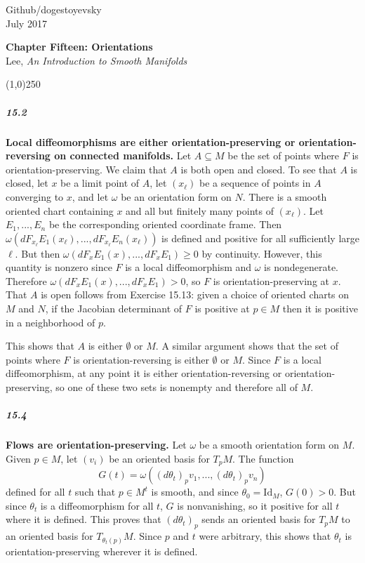 \documentclass[10pt,letter]{article}
\begin{document}
\noindent Github/dogestoyevsky \\
July 2017
\begin{center}
\textbf{Chapter Fifteen: Orientations}\\ Lee, \textit{An Introduction to Smooth Manifolds}

\line(1,0){250}
\end{center}
\subparagraph*{15.2} {\bf Local diffeomorphisms are either orientation-preserving or orientation-reversing on connected manifolds.} Let $A \subseteq M$ be the set of points where $F$ is orientation-preserving. We claim that $A$ is both open and closed. To see that $A$ is closed, let $x$ be a limit point of $A$, let $(x_\ell)$ be a sequence of points in $A$ converging to $x$, and let $\omega$ be an orientation form on $N$. There is a smooth oriented chart containing $x$ and all but finitely many points of $(x_\ell)$. Let $E_1,...,E_n$ be the corresponding oriented coordinate frame. Then $\omega(dF_{x_\ell}E_1(x_\ell),...,dF_{x_\ell}E_n(x_\ell))$ is defined and positive for all sufficiently large $\ell$. But then $\omega(dF_{x}E_1(x),...,dF_{x}E_1) \geq 0$ by continuity. However, this quantity is nonzero since $F$ is a local diffeomorphism and $\omega$ is nondegenerate. Therefore $\omega(dF_{x}E_1(x),...,dF_{x}E_1) > 0$, so $F$ is orientation-preserving at $x$. That $A$ is open follows from Exercise 15.13: given a choice of oriented charts on $M$ and $N$, if the Jacobian determinant of $F$ is positive at $p \in M$ then it is positive in a neighborhood of $p$. 

This shows that $A$ is either $\emptyset$ or $M$. A similar argument shows that the set of points where $F$ is orientation-reversing is either $\emptyset$ or $M$. Since $F$ is a local diffeomorphism, at any point it is either orientation-reversing or orientation-preserving, so one of these two sets is nonempty and therefore all of $M$. 

\subparagraph*{15.4} {\bf Flows are orientation-preserving.} Let $\omega$ be a smooth orientation form on $M$. Given $p \in M$, let $(v_i)$ be an oriented basis for $T_pM$. The function \[ G(t) =  \omega((d\theta_t)_p v_1,...,(d\theta_t)_p v_n) \] defined for all $t$ such that $p \in M^t$ is smooth, and since $\theta_0 = \text{Id}_M$, $G(0) > 0$. But since $\theta_t$ is a diffeomorphism for all $t$, $G$ is nonvanishing, so it positive for all $t$ where it is defined. This proves that $(d\theta_t)_p$ sends an oriented basis for $T_pM$ to an oriented basis for $T_{\theta_t(p)}M$. Since $p$ and $t$ were arbitrary, this shows that $\theta_t$ is orientation-preserving wherever it is defined. 
\end{document}
